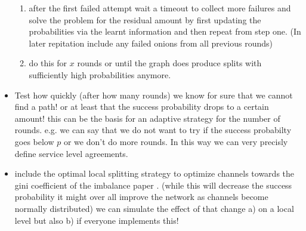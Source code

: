 \documentclass[10pt,twocolumn]{article}
\begin{document}
\begin{itemize}
\begin{enumerate}
  \item after the first failed attempt wait a timeout to collect more failures and solve the problem for the residual amount by first updating the probabilities via the learnt information and then repeat from step one. (In later repitation include any failed onions from all previous rounds)
  \item do this for $x$ rounds or until the graph does produce splits with sufficiently high probabilities anymore. 
  \end{enumerate}
\item Test how quickly (after how many rounds) we know for sure that we cannot find a path! or at least that the success probability drops to a certain amount! this can be the basis for an adaptive strategy for the number of rounds. e.g. we can say that we do not want to try if the success probabilty goes below $p$ or we don't do more rounds. In this way we can very precisly define service level agreements.
  \item include the optimal local splitting strategy to optimize channels towards the gini coefficient of the imbalance paper \cite{Pickhardt2019}. (while this will decrease the success probability it might over all improve the network as channels become normally distributed) we can simulate the effect of that change a) on a local level but also b) if everyone implements this!
\end{itemize}






\end{document}
